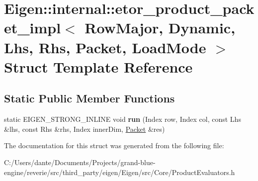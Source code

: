 \hypertarget{struct_eigen_1_1internal_1_1etor__product__packet__impl_3_01_row_major_00_01_dynamic_00_01_lhs_0c65718b6a3655f284deba0aadf4c1914}{}\section{Eigen\+::internal\+::etor\+\_\+product\+\_\+packet\+\_\+impl$<$ Row\+Major, Dynamic, Lhs, Rhs, Packet, Load\+Mode $>$ Struct Template Reference}
\label{struct_eigen_1_1internal_1_1etor__product__packet__impl_3_01_row_major_00_01_dynamic_00_01_lhs_0c65718b6a3655f284deba0aadf4c1914}
\subsection*{Static Public Member Functions}
\begin{DoxyCompactItemize}
\item 
\mbox{\label{struct_eigen_1_1internal_1_1etor__product__packet__impl_3_01_row_major_00_01_dynamic_00_01_lhs_0c65718b6a3655f284deba0aadf4c1914_aaa718357e8131925569cc9cd0363ef63}} 
static E\+I\+G\+E\+N\+\_\+\+S\+T\+R\+O\+N\+G\+\_\+\+I\+N\+L\+I\+NE void {\bfseries run} (Index row, Index col, const Lhs \&lhs, const Rhs \&rhs, Index inner\+Dim, \mbox{\hyperlink{union_eigen_1_1internal_1_1_packet}{Packet}} \&res)
\end{DoxyCompactItemize}


The documentation for this struct was generated from the following file\+:\begin{DoxyCompactItemize}
\item 
C\+:/\+Users/dante/\+Documents/\+Projects/grand-\/blue-\/engine/reverie/src/third\+\_\+party/eigen/\+Eigen/src/\+Core/Product\+Evaluators.\+h\end{DoxyCompactItemize}
